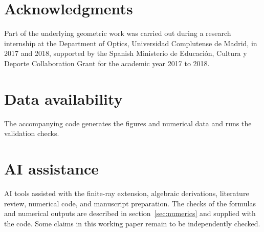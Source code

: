 \documentclass[11pt,a4paper]{article}
\begin{document}
\section*{Acknowledgments}
Part of the underlying geometric work was carried out during a research internship at the Department of Optics, Universidad Complutense de Madrid, in 2017 and 2018, supported by the Spanish Ministerio de Educaci\'on, Cultura y Deporte Collaboration Grant for the academic year 2017 to 2018.

\section*{Data availability}
The accompanying code generates the figures and numerical data and runs the validation checks.

\section*{AI assistance}
AI tools assisted with the finite-ray extension, algebraic derivations, literature review, numerical code, and manuscript preparation. The checks of the formulas and numerical outputs are described in section~\ref{sec:numerics} and supplied with the code. Some claims in this working paper remain to be independently checked.



\end{document}
